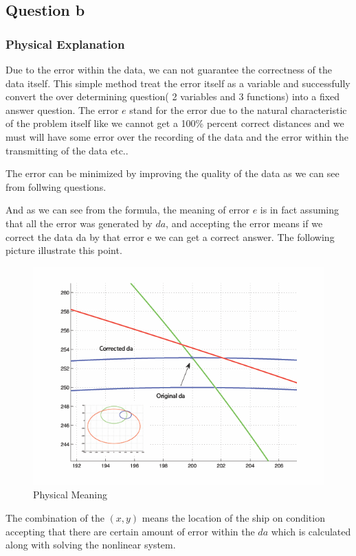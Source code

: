 \documentclass[11pt]{article}
\begin{document}
\subsection{Question b}
\subsubsection{Physical Explanation}
Due to the error within the data, we can not guarantee the correctness of the data itself. This simple method treat the error itself as a variable and successfully convert the over determining question( 2 variables and 3 functions) into a fixed answer question. The error $e$ stand for the error due to the natural characteristic of the problem itself like we cannot get a 100\% percent correct distances and we must will have some error over the recording of the data and the error within the transmitting of the data etc..

The error can be minimized by improving the quality of the data as we can see from follwing questions.

And as we can see from the formula, the meaning of error $e$ is in fact assuming that all the error was generated by $da$, and accepting the error means if we correct the data da by that error e we can get a correct answer. The following picture illustrate this point.

\begin{figure}[h]
\centering
\includegraphics[scale=0.4]{p3.png}
\caption{Physical Meaning}
\medskip
\end{figure}

The combination of the $(x,y)$ means the location of the ship on condition accepting that there are certain amount of error within the $da$ which is calculated along with solving the nonlinear system.
\end{document}
